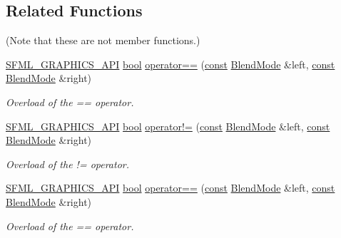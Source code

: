 \subsection*{Related Functions}
(Note that these are not member functions.) \begin{DoxyCompactItemize}
\item 
\hyperlink{sfml_2dep_2_s_f_m_l-2_84_82_2include_2_s_f_m_l_2_graphics_2_export_8hpp_ab84c9f1035e146917de3bc0f98d72b35}{S\-F\-M\-L\-\_\-\-G\-R\-A\-P\-H\-I\-C\-S\-\_\-\-A\-P\-I} \hyperlink{term__entry_8h_a002004ba5d663f149f6c38064926abac}{bool} \hyperlink{structsf_1_1_blend_mode_ae13d2e80e55c5263eb9413fde7f74443}{operator==} (\hyperlink{term__entry_8h_a57bd63ce7f9a353488880e3de6692d5a}{const} \hyperlink{structsf_1_1_blend_mode}{Blend\-Mode} \&left, \hyperlink{term__entry_8h_a57bd63ce7f9a353488880e3de6692d5a}{const} \hyperlink{structsf_1_1_blend_mode}{Blend\-Mode} \&right)
\begin{DoxyCompactList}\small\item\em Overload of the == operator. \end{DoxyCompactList}\item 
\hyperlink{sfml_2dep_2_s_f_m_l-2_84_82_2include_2_s_f_m_l_2_graphics_2_export_8hpp_ab84c9f1035e146917de3bc0f98d72b35}{S\-F\-M\-L\-\_\-\-G\-R\-A\-P\-H\-I\-C\-S\-\_\-\-A\-P\-I} \hyperlink{term__entry_8h_a002004ba5d663f149f6c38064926abac}{bool} \hyperlink{structsf_1_1_blend_mode_a0c08bfcb9b6911104dcc0c0cddde522a}{operator!=} (\hyperlink{term__entry_8h_a57bd63ce7f9a353488880e3de6692d5a}{const} \hyperlink{structsf_1_1_blend_mode}{Blend\-Mode} \&left, \hyperlink{term__entry_8h_a57bd63ce7f9a353488880e3de6692d5a}{const} \hyperlink{structsf_1_1_blend_mode}{Blend\-Mode} \&right)
\begin{DoxyCompactList}\small\item\em Overload of the != operator. \end{DoxyCompactList}\item 
\hyperlink{sfml_2dep_2_s_f_m_l-2_84_82_2include_2_s_f_m_l_2_graphics_2_export_8hpp_ab84c9f1035e146917de3bc0f98d72b35}{S\-F\-M\-L\-\_\-\-G\-R\-A\-P\-H\-I\-C\-S\-\_\-\-A\-P\-I} \hyperlink{term__entry_8h_a002004ba5d663f149f6c38064926abac}{bool} \hyperlink{structsf_1_1_blend_mode_ae13d2e80e55c5263eb9413fde7f74443}{operator==} (\hyperlink{term__entry_8h_a57bd63ce7f9a353488880e3de6692d5a}{const} \hyperlink{structsf_1_1_blend_mode}{Blend\-Mode} \&left, \hyperlink{term__entry_8h_a57bd63ce7f9a353488880e3de6692d5a}{const} \hyperlink{structsf_1_1_blend_mode}{Blend\-Mode} \&right)
\begin{DoxyCompactList}\small\item\em Overload of the == operator. \end{DoxyCompactList}\item 

\end{DoxyCompactItemize}
